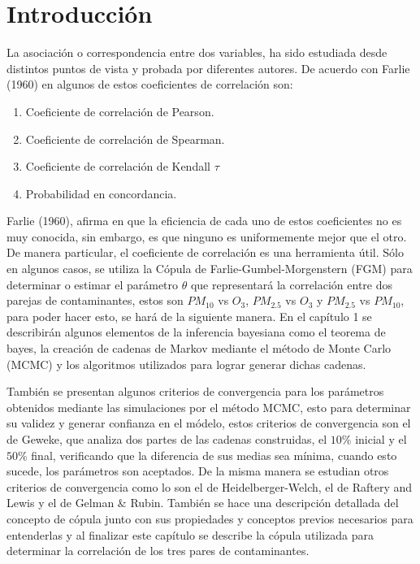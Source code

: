 \chapter*{Introducción}


La asociación o correspondencia entre dos variables, ha sido estudiada desde distintos puntos de vista y probada por diferentes autores. De acuerdo con Farlie (1960) en \cite{farlie} algunos de estos coeficientes de correlación son: 

\begin{enumerate}
\item Coeficiente de correlación de Pearson.
\item Coeficiente de correlación de Spearman.
\item Coeficiente de correlación de Kendall $\tau$
\item Probabilidad en concordancia. 
\end{enumerate}

Farlie (1960), afirma en \cite{farlie} que la eficiencia de cada uno de estos coeficientes no es muy conocida, sin embargo, es que ninguno es uniformemente mejor que el otro. De manera particular, el coeficiente de correlación es una herramienta útil. Sólo en algunos casos, se utiliza la Cópula de Farlie-Gumbel-Morgenstern (FGM) para determinar o estimar el parámetro $\theta$ que representará la correlación entre dos parejas de contaminantes, estos son $PM_{10}$ vs $O_3$, $PM_{2.5}$ vs $O_3$ y $PM_{2.5}$ vs $PM_{10}$, para poder hacer esto, se hará de la siguiente manera. En el capítulo 1 se describirán algunos elementos de la inferencia bayesiana como el teorema de bayes, la creación de cadenas de Markov mediante el método de Monte Carlo (MCMC) y los algoritmos utilizados para lograr generar dichas cadenas. 

También se presentan algunos criterios de convergencia para los parámetros obtenidos mediante las simulaciones por el método MCMC, esto para determinar su validez y generar confianza en el módelo, estos criterios de convergencia son el de Geweke, que analiza dos partes de las cadenas construidas, el $10\%$ inicial y el $50\%$ final, verificando que la diferencia de sus medias sea mínima, cuando esto sucede, los parámetros son aceptados. De la misma manera se estudian otros criterios de convergencia como lo son el de Heidelberger-Welch, el de Raftery and Lewis y el de Gelman $\&$ Rubin. También se hace una descripción detallada del concepto de cópula junto con sus propiedades y conceptos previos necesarios para entenderlas y al finalizar este capítulo se describe la cópula utilizada para determinar la correlación de los tres pares de contaminantes. \\

